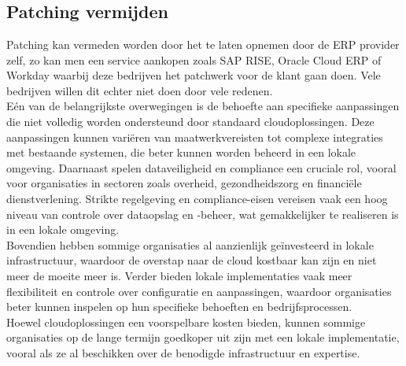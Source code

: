 \documentclass[dutch,dit,thesis]{hogentreport}
\begin{document}
\chapter{}
\label{ch:corpus}

\section{Patching vermijden}

Patching kan vermeden worden door het te laten opnemen door de ERP provider zelf, zo kan men een service aankopen zoals SAP RISE, Oracle Cloud ERP of Workday waarbij deze bedrijven het patchwerk voor de klant gaan doen. Vele bedrijven
 willen dit echter niet doen door vele redenen.\\
 
 Eén van de belangrijkste overwegingen is de behoefte aan specifieke aanpassingen die niet volledig worden ondersteund door standaard cloudoplossingen. 
 Deze aanpassingen kunnen variëren van maatwerkvereisten tot complexe integraties met bestaande systemen, die beter kunnen worden beheerd in een lokale omgeving.
Daarnaast spelen dataveiligheid en compliance een cruciale rol, vooral voor organisaties in sectoren zoals overheid, gezondheidszorg en financiële dienstverlening.
 Strikte regelgeving en compliance-eisen vereisen vaak een hoog niveau van controle over dataopslag en -beheer, wat gemakkelijker te realiseren is in een lokale omgeving.\\ 

Bovendien hebben sommige organisaties al aanzienlijk geïnvesteerd in lokale infrastructuur, waardoor de overstap naar de cloud kostbaar kan zijn en niet meer de moeite meer is.
Verder bieden lokale implementaties vaak meer flexibiliteit en controle over configuratie en aanpassingen, waardoor organisaties beter kunnen inspelen op hun specifieke behoeften en 
bedrijfsprocessen.\\

Hoewel cloudoplossingen een voorspelbare kosten bieden, kunnen sommige organisaties op de lange termijn goedkoper uit zijn met een lokale implementatie, vooral als
ze al beschikken over de benodigde infrastructuur en expertise.\\
\end{document}
